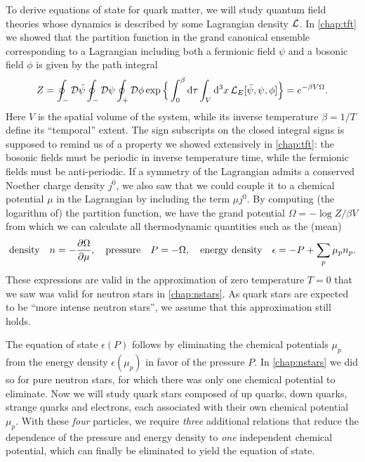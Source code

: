 To derive equations of state for quark matter, we will study quantum field theories whose dynamics is described by some Lagrangian density $\mathcal{L}$.
In \cref{chap:tft} we showed that the partition function in the grand canonical ensemble corresponding to a Lagrangian including both a fermionic field $\psi$ and a bosonic field $\phi$ is given by the path integral
\begin{equation}
	Z = \oint_- \mathcal{D} \bar{\psi} \oint_- \mathcal{D} \psi \oint_+ \mathcal{D} \phi \exp \Big\{ \int_0^\beta \mathop{}\!\mathrm{d} \tau \int_V \mathop{}\!\mathrm{d}^3 x \, \mathcal{L}_E[\bar{\psi}, \psi, \phi] \Big\} = e^{-\beta V \Omega} .
\end{equation}
Here $V$ is the spatial volume of the system, while its inverse temperature $\beta = 1/T$ define its ``temporal'' extent.
The sign subscripts on the closed integral signs is supposed to remind us of a property we showed extensively in \cref{chap:tft}: the bosonic fields must be periodic in inverse temperature time, while the fermionic fields must be anti-periodic.
If a symmetry of the Lagrangian admits a conserved Noether charge density $j^0$, we also saw that we could couple it to a chemical potential $\mu$ in the Lagrangian by including the term $\mu j^0$.
By computing (the logarithm of) the partition function, we have the grand potential $\Omega = -\log Z / \beta V$ from which we can calculate all thermodynamic quantities such as the (mean)
\begin{equation}
	\text{density} \quad n = -\pdv{\Omega}{\mu}, \quad
	\text{pressure} \quad P = -\Omega, \quad
	\text{energy density} \quad \epsilon = -P + \sum_p \mu_p n_p .
\end{equation}
These expressions are valid in the approximation of zero temperature $T=0$ that we saw was valid for neutron stars in \cref{chap:nstars}.
As quark stars are expected to be ``more intense neutron stars'', we assume that this approximation still holds.

The equation of state $\epsilon(P)$ follows by eliminating the chemical potentials $\mu_p$ from the energy density $\epsilon(\mu_p)$ in favor of the pressure $P$.
In \cref{chap:nstars} we did so for pure neutron stars, for which there was only one chemical potential to eliminate.
Now we will study quark stars composed of up quarks, down quarks, strange quarks and electrons, each associated with their own chemical potential $\mu_p$.
With these \emph{four} particles, we require \emph{three} additional relations that reduce the dependence of the pressure and energy density to \emph{one} independent chemical potential, which can finally be eliminated to yield the equation of state.

